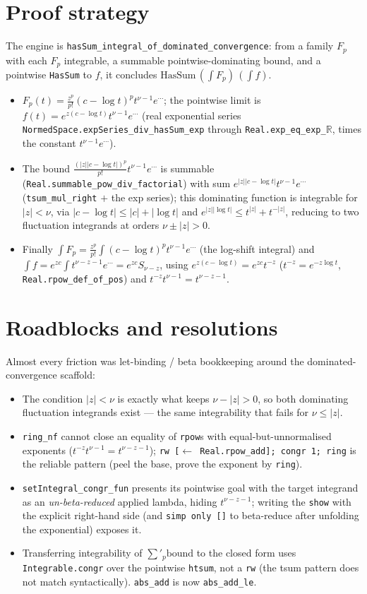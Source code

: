 \documentclass[11pt]{article}
\begin{document}
\section{Proof strategy}
The engine is \texttt{hasSum\_integral\_of\_dominated\_convergence}: from a family $F_p$ with each $F_p$
integrable, a summable pointwise-dominating bound, and a pointwise \texttt{HasSum} to $f$, it concludes
$\mathrm{HasSum}\,(\int F_p)\,(\int f)$.
\begin{itemize}
\item $F_p(t)=\frac{z^p}{p!}(c-\log t)^p t^{\nu-1}e^{\cdots}$; the pointwise limit is
$f(t)=e^{z(c-\log t)}t^{\nu-1}e^{\cdots}$ (real exponential series
\texttt{NormedSpace.expSeries\_div\_hasSum\_exp} through \texttt{Real.exp\_eq\_exp\_$\mathbb R$},
times the constant $t^{\nu-1}e^{\cdots}$).
\item The bound $\frac{(|z||c-\log t|)^p}{p!}t^{\nu-1}e^{\cdots}$ is summable
(\texttt{Real.summable\_pow\_div\_factorial}) with sum $e^{|z||c-\log t|}t^{\nu-1}e^{\cdots}$
(\texttt{tsum\_mul\_right} $+$ the exp series); this dominating function is integrable for $|z|<\nu$,
via $|c-\log t|\le|c|+|\log t|$ and $e^{|z||\log t|}\le t^{|z|}+t^{-|z|}$, reducing to two fluctuation
integrands at orders $\nu\pm|z|>0$.
\item Finally $\int F_p=\frac{z^p}{p!}\int(c-\log t)^p t^{\nu-1}e^{\cdots}$ (the log-shift integral) and
$\int f=e^{zc}\int t^{\nu-z-1}e^{\cdots}=e^{zc}S_{\nu-z}$, using
$e^{z(c-\log t)}=e^{zc}t^{-z}$ ($t^{-z}=e^{-z\log t}$, \texttt{Real.rpow\_def\_of\_pos}) and
$t^{-z}t^{\nu-1}=t^{\nu-z-1}$.
\end{itemize}

\section{Roadblocks and resolutions}
Almost every friction was let-binding / beta bookkeeping around the dominated-convergence scaffold:
\begin{itemize}
\item The condition $|z|<\nu$ is exactly what keeps $\nu-|z|>0$, so both dominating fluctuation
integrands exist --- the same integrability that fails for $\nu\le|z|$.
\item \texttt{ring\_nf} cannot close an equality of \texttt{rpow}s with equal-but-unnormalised exponents
($t^{-z}t^{\nu-1}=t^{\nu-z-1}$); \texttt{rw [$\leftarrow$ Real.rpow\_add]; congr 1; ring} is the reliable
pattern (peel the base, prove the exponent by \texttt{ring}).
\item \texttt{setIntegral\_congr\_fun} presents its pointwise goal with the target integrand as an
\emph{un-beta-reduced} applied lambda, hiding $t^{\nu-z-1}$; writing the \texttt{show} with the explicit
right-hand side (and \texttt{simp only []} to beta-reduce after unfolding the exponential) exposes it.
\item Transferring integrability of $\sum'_p\mathrm{bound}$ to the closed form uses
\texttt{Integrable.congr} over the pointwise \texttt{htsum}, not a \texttt{rw} (the tsum pattern does not
match syntactically). \texttt{abs\_add} is now \texttt{abs\_add\_le}.
\end{itemize}
\end{document}
